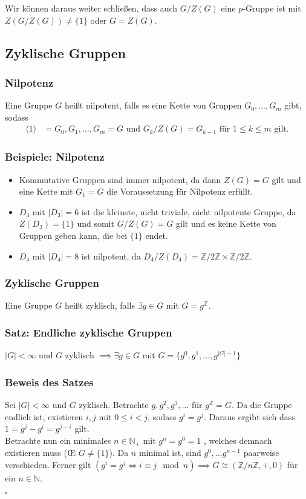 \documentclass[12pt, german]{article}
\newcommand{\N}{\mathbb{N}}
\newcommand{\bewiesen}{
	
	\begin{flushright}
		$\square$  \\
\end{flushright}}
\begin{document}
	
	Wir können daraus weiter schlie\ss en, dass auch $G/Z(G)$ eine $p$-Gruppe ist mit $Z(G/Z(G)) \not = \{1\}$ oder $G=Z(G)$.
	
	
	\subsection{Zyklische Gruppen}
	\subsubsection{Nilpotenz}
	Eine Gruppe $G$ hei\ss t nilpotent, falls es eine Kette von Gruppen $G_0,\ldots,G_m$ gibt, sodass
	\begin{align*}
		\langle 1 \rangle &= G_0, G_1, \ldots, G_m = G  \text{ und } G_k/Z(G) = G_{k-1} \text{ für } 1 \leq k \leq m \text{ gilt.}
	\end{align*}
	
	\subsubsection{Beispiele: Nilpotenz}
	\begin{itemize}
		\item Kommutative Gruppen sind immer nilpotent, da dann $Z(G)=G$ gilt und eine Kette mit $G_1=G$ die Voraussetzung für Nilpotenz erfüllt.
		\item $D_3$ mit $|D_3| = 6$ ist die kleinste, nicht triviale, nicht nilpotente Gruppe, da $Z(D_3) = \{1\}$ und somit $G/Z(G)=G$ gilt und es keine Kette von Gruppen geben kann, die bei $\{1\}$ endet.
		\item $D_4$ mit $|D_4| = 8$ ist nilpotent, da $D_4/Z(D_4) = \mathbb Z/2 \mathbb Z \times \mathbb Z /2\mathbb Z$.
	\end{itemize}
	
	\subsubsection{Zyklische Gruppen}
	Eine Gruppe $G$ hei\ss t zyklisch, falls $\exists g \in G$ mit $G=g^{\mathbb Z}$.
	
	\subsubsection{Satz: Endliche zyklische Gruppen}
	$|G| < \infty$ und $G$ zyklisch $\implies \exists g \in G$ mit $G =\{g^0, g^1, \ldots, g^{|G| -1} \}$  
	
	\subsubsection{Beweis des Satzes }
	Sei $|G|<\infty$ und $G$ zyklisch. Betrachte $g, g^2, g^3, \ldots$ für $g^{\mathbb Z}=G$. Da die Gruppe endlich ist, existieren $i,j$ mit $0 \leq i < j $, sodass $g^i = g^j$. Daraus ergibt sich dass $1 = g^j-g^i=g^{j-i}$ gilt. \\
	Betrachte nun ein minimales $n \in \mathbb N_+$ mit $g^n = g^0 = 1$ , welches demnach existieren muss (\OE  $\, \,G \not = \{1\}$).
	Da $n$ minimal ist, sind  $g^0, \ldots g^{n-1}$ paarweise verschieden. Ferner gilt $(g^i = g^j \iff i \equiv j \mod n) \implies G \cong (\mathbb Z /n\mathbb Z, +, 0)$ für ein $n \in \N$.
	\bewiesen
	
\end{document}
